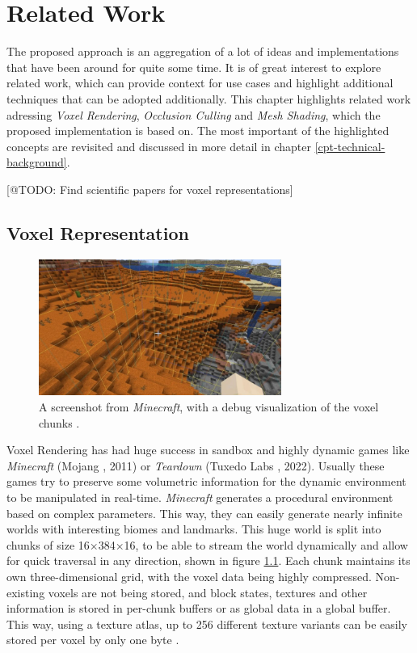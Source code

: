 \chapter{Related Work} \label{cpt-related-work}

The proposed approach is an aggregation of a lot of ideas and implementations that have been 
around for quite some time. It is of great interest to explore related work, which can provide 
context for use cases and highlight additional techniques that can be adopted additionally. 
This chapter highlights related work adressing \emph{Voxel Rendering}, \emph{Occlusion Culling} 
and \emph{Mesh Shading}, which the proposed implementation is based on. The most important of 
the highlighted concepts are revisited and discussed in more detail in chapter 
\ref{cpt-technical-background}. 

[@TODO: Find scientific papers for voxel representations]

\section{Voxel Representation} \label{sec-voxel-representation}

\begin{figure}[h]
    \centering
    \includegraphics[width=300px]{images/graphics/minecraft-chunks.jpg}
    \caption{A screenshot from \emph{Minecraft}, with a debug visualization of the voxel chunks \cite{Palm2022}.}
    \label{fig:minecraft-chunks}
\end{figure}

\noindent
Voxel Rendering has had huge success in sandbox and highly dynamic games like \emph{Minecraft} (Mojang 
\cite{Mojang2024}, 2011) or \emph{Teardown} (Tuxedo Labs \cite{TuxedoLabs2022}, 2022). Usually these games try 
to preserve some volumetric information for the dynamic environment to be manipulated in real-time. \emph{Minecraft} 
generates a procedural environment based on complex parameters. This way, they can easily generate nearly infinite 
worlds with interesting biomes and landmarks. This huge world is split into chunks of size 16×384×16, to be able to 
stream the world dynamically and allow for quick traversal in any direction, shown in figure \ref{fig:minecraft-chunks}.
Each chunk maintains its own three-dimensional grid, with the voxel data being highly compressed. Non-existing voxels 
are not being stored, and block states, textures and other information is stored in per-chunk buffers or as global 
data in a global buffer. This way, using a texture atlas, up to 256 different texture variants can be easily stored 
per voxel by only one byte \cite{Bergensten2012, MinecraftFandom2021}. \\

